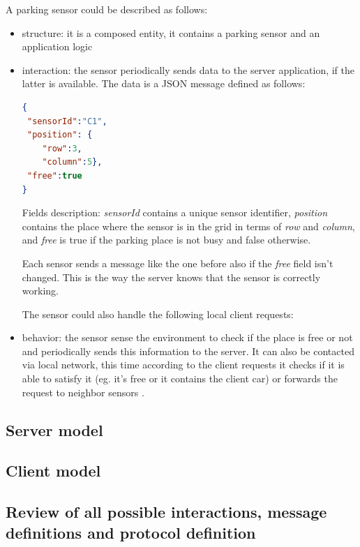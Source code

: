 \documentclass[11pt]{article}
\begin{document}
A parking sensor could be described as follows:
\begin{itemize}
\item structure: it is a composed entity, it contains a parking sensor and an application logic
\item interaction: the sensor periodically sends data to the server application, if the latter is available. The data is a JSON message defined as follows:

\begin{lstlisting}[language=json,firstnumber=1]
{
 "sensorId":"C1",
 "position": {
	"row":3,
	"column":5},
 "free":true
}
\end{lstlisting}

Fields description: \emph{sensorId} contains a unique sensor identifier, \emph{position} contains the place where the sensor is in the grid in terms of \emph{row} and \emph{column}, and \emph{free} is true if the parking place is not busy and false otherwise.

Each sensor sends a message like the one before also if the \emph{free} field isn't changed. This is the way the server knows that the sensor is correctly working.

The sensor could also handle the following local client requests:

\item behavior: the sensor sense the environment to check if the place is free or not and periodically sends this information to the server. It can also be contacted via local network, this time according to the client requests it checks if it is able to satisfy it (eg. it's free or it contains the client car) or forwards the request to neighbor sensors .
\end{itemize}

\subsection{Server model}

\subsection{Client model}

\subsection{Review of all possible interactions, message definitions and protocol definition}
\end{document}
